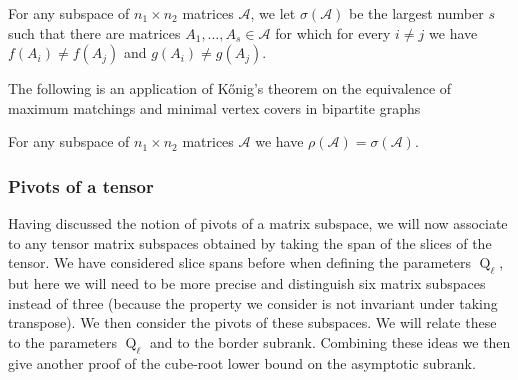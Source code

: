 \documentclass{daj}
\DeclareMathOperator{\subrank}{Q}
\begin{document}
\begin{definition}
    For any subspace of $n_1 \times n_2$ matrices $\mathcal{A}$, we let $\sigma(\mathcal{A})$ be the largest number $s$ such that there are matrices $A_1, \ldots, A_s \in \mathcal{A}$ for which for every $i\neq j$ we have $f(A_i) \neq f(A_j)$ and $g(A_i) \neq g(A_j)$.%
\end{definition}
%

The following is an application of Kőnig's theorem on the equivalence of maximum matchings and minimal vertex covers in bipartite graphs 
%

\begin{lemma} \label{lem:pivots-max-ind-min-lines}
    For any subspace of $n_1 \times n_2$ matrices $\mathcal{A}$ we have $\rho(\mathcal{A}) = \sigma(\mathcal{A})$.
\end{lemma}
%
%
%

%
%
%

%

%
%
    
%

%
%
%
%

%


\subsubsection{Pivots of a tensor}

Having discussed the notion of pivots of a matrix subspace, we will now associate to any tensor matrix subspaces obtained by taking the span of the slices of the tensor. We have considered slice spans before when defining the parameters $\subrank_\ell$, but here we will need to be more precise and distinguish six matrix subspaces instead of three (because the property we consider is not invariant under taking transpose). We then consider the pivots of these subspaces. We will relate these to the parameters $\subrank_\ell$ and to the border subrank. Combining these ideas we then give another proof of the cube-root lower bound on the asymptotic subrank.
\end{document}
